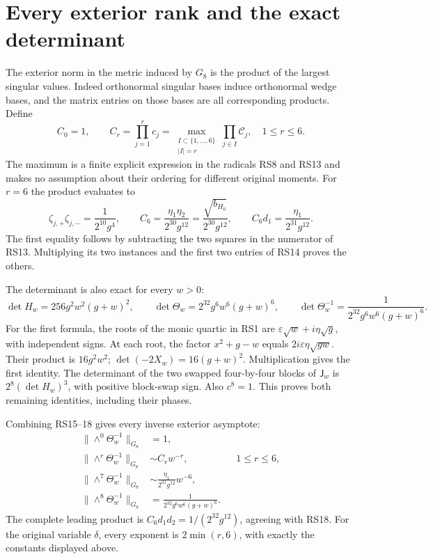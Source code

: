 \documentclass[11pt]{article}
\begin{document}
\section{Every exterior rank and the exact determinant}
The exterior norm in the metric induced by $G_8$ is the product
of the largest singular values. Indeed orthonormal singular
bases induce orthonormal wedge bases, and the matrix entries
on those bases are all corresponding products. Define
\begin{equation}
 C_0=1,\qquad C_r=\prod_{j=1}^r c_j
 =\max_{\substack{I\subset\{1,\ldots,6\}\\|I|=r}}
                         \prod_{j\in I}\mathcal C_j,
 \quad1\le r\le6.
 \tag{RS16}
\end{equation}
The maximum is a finite explicit expression in the radicals
RS8 and RS13 and makes no assumption about their ordering for
different original moments. For $r=6$ the product evaluates to
\begin{equation}
 \zeta_{j,+}\zeta_{j,-}=\frac1{2^{10}g^4},\qquad
 C_6=\frac{\eta_1\eta_2}{2^{30}g^{12}}
     =\frac{\sqrt{b_{H_0}}}{2^{30}g^{12}},\qquad
 C_6d_1=\frac{\eta_1}{2^{31}g^{12}}.
 \tag{RS17}
\end{equation}
The first equality follows by subtracting the two squares in
the numerator of RS13. Multiplying its two instances and
the first two entries of RS14 proves the others.

The determinant is also exact for every $w>0$:
\begin{equation}
 \det H_w=256g^2w^2(g+w)^2,\qquad
 \det\Theta_w=2^{32}g^6w^6(g+w)^6,\qquad
 \det\Theta_w^{-1}=\frac1{2^{32}g^6w^6(g+w)^6}.
 \tag{RS18}
\end{equation}
For the first formula, the roots of the monic quartic in RS1
are $\varepsilon\sqrt w+i\eta\sqrt g$, with independent signs.
At each root, the factor $x^2+g-w$ equals
$2i\varepsilon\eta\sqrt{gw}$. Their product is $16g^2w^2$;
$\det(-2X_w)=16(g+w)^2$. Multiplication gives the first
identity. The determinant of the two swapped four-by-four
blocks of $\mathsf J_w$ is $2^8(\det H_w)^3$, with positive
block-swap sign. Also $c^8=1$. This proves both remaining
identities, including their phases.

Combining RS15--18 gives every inverse exterior asymptote:
\begin{equation}
 \boxed{\begin{aligned}
 \|\wedge^0\Theta_w^{-1}\|_{G_8}&=1,\\
 \|\wedge^r\Theta_w^{-1}\|_{G_8}&\sim C_rw^{-r},&&1\le r\le6,\\
 \|\wedge^7\Theta_w^{-1}\|_{G_8}&\sim
                       \frac{\eta_1}{2^{31}g^{12}}w^{-6},\\
 \|\wedge^8\Theta_w^{-1}\|_{G_8}&=
                       \frac1{2^{32}g^6w^6(g+w)^6}.
 \end{aligned}}
 \tag{RS19}
\end{equation}
The complete leading product is
$C_6d_1d_2=1/(2^{32}g^{12})$, agreeing with RS18.
For the original variable $\delta$, every exponent is
$2\min(r,6)$, with exactly the constants displayed above.
\end{document}
